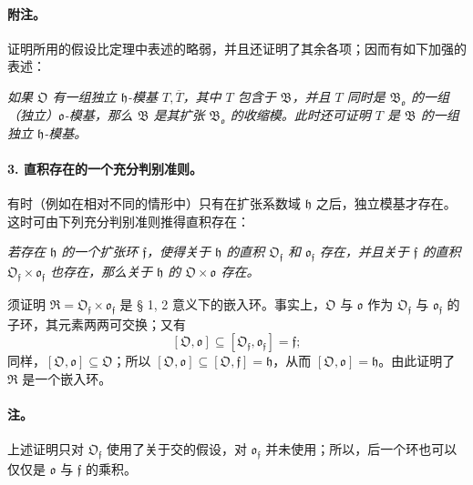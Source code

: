 \paragraph{附注。}
证明所用的假设比定理中表述的略弱，并且还证明了其余各项；因而有如下加强的表述：

\emph{如果 \(\mathfrak O\) 有一组独立 \(\mathfrak h\)-模基 \(T,\overline T\)，其中 \(T\) 包含于 \(\mathfrak B\)，并且 \(T\) 同时是 \(\mathfrak B_{\mathfrak o}\) 的一组（独立）\(\mathfrak o\)-模基，那么 \(\mathfrak B\) 是其扩张 \(\mathfrak B_{\mathfrak o}\) 的收缩模。此时还可证明 \(T\) 是 \(\mathfrak B\) 的一组独立 \(\mathfrak h\)-模基。}

\paragraph{3. 直积存在的一个充分判别准则。}
有时（例如在相对不同的情形中）只有在扩张系数域 \(\mathfrak h\) 之后，独立模基才存在。这时可由下列充分判别准则推得直积存在：

\emph{若存在 \(\mathfrak h\) 的一个扩张环 \(\mathfrak f\)，使得关于 \(\mathfrak h\) 的直积 \(\mathfrak O_{\mathfrak f}\) 和 \(\mathfrak o_{\mathfrak f}\) 存在，并且关于 \(\mathfrak f\) 的直积 \(\mathfrak O_{\mathfrak f}\times\mathfrak o_{\mathfrak f}\) 也存在，那么关于 \(\mathfrak h\) 的 \(\mathfrak O\times\mathfrak o\) 存在。}

须证明 \(\mathfrak R=\mathfrak O_{\mathfrak f}\times\mathfrak o_{\mathfrak f}\) 是 § 1, 2 意义下的嵌入环。事实上，\(\mathfrak O\) 与 \(\mathfrak o\) 作为 \(\mathfrak O_{\mathfrak f}\) 与 \(\mathfrak o_{\mathfrak f}\) 的子环，其元素两两可交换；又有
\[
[\mathfrak O,\mathfrak o]\subseteq[\mathfrak O_{\mathfrak f},\mathfrak o_{\mathfrak f}]=\mathfrak f;
\]
同样，\([\mathfrak O,\mathfrak o]\subseteq\mathfrak O\)；所以 \([\mathfrak O,\mathfrak o]\subseteq[\mathfrak O,\mathfrak f]=\mathfrak h\)，从而 \([\mathfrak O,\mathfrak o]=\mathfrak h\)。由此证明了 \(\mathfrak R\) 是一个嵌入环。

\paragraph{注。}
上述证明只对 \(\mathfrak O_{\mathfrak f}\) 使用了关于交的假设，对 \(\mathfrak o_{\mathfrak f}\) 并未使用；所以，后一个环也可以仅仅是 \(\mathfrak o\) 与 \(\mathfrak f\) 的乘积。
